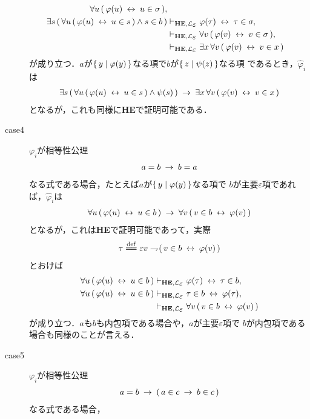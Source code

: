 \begin{metaprf}
\begin{description}
\begin{align}
					\forall u\, (\, \varphi(u) \lrarrow u \in \sigma\, ), \\
					\exists s\, (\, \forall u\, (\, \varphi(u) \lrarrow u \in s\, )
					\wedge s \in b\, )
					&\provable{\mbox{{\bf HE}},\lang{\varepsilon}} \varphi(\tau) \lrarrow \tau \in \sigma, \\
					&\provable{\mbox{{\bf HE}},\lang{\varepsilon}} \forall v\, (\, \varphi(v) \lrarrow v \in \sigma\, ), \\
					&\provable{\mbox{{\bf HE}},\lang{\varepsilon}} \exists x\, \forall v\, (\, \varphi(v) \lrarrow v \in x\, )
				\end{align}
				が成り立つ．$a$が$\{\, y \mid \varphi(y)\, \}$なる項で$b$が$\{\, z \mid \psi(z)\, \}$なる項
				であるとき，$\widehat{\varphi}_{i}$は
				\begin{align}
					\exists s\, (\, \forall u\, (\, \varphi(u) \hspace{0.25em}\leftrightarrow\hspace{0.25em} u \in s\, )
					\wedge \psi(s)\, ) \hspace{0.25em}\rightarrow\hspace{0.25em} \exists x\, \forall v\, (\, \varphi(v) \hspace{0.25em}\leftrightarrow\hspace{0.25em} v \in x\, )
				\end{align}
				となるが，これも同様に{\bf HE}で証明可能である．
				
			\item[case4] $\varphi_{i}$が相等性公理
				\begin{align}
					a = b \hspace{0.25em}\rightarrow\hspace{0.25em} b = a
				\end{align}
				なる式である場合，たとえば$a$が$\{\, y \mid \varphi(y)\, \}$なる項で
				$b$が主要$\varepsilon$項であれば，$\widehat{\varphi}_{i}$は
				\begin{align}
					\forall u\, (\, \varphi(u) \hspace{0.25em}\leftrightarrow\hspace{0.25em} u \in b\, ) 
					\hspace{0.25em}\rightarrow\hspace{0.25em} \forall v\, (\, v \in b \hspace{0.25em}\leftrightarrow\hspace{0.25em} \varphi(v)\, ) 
				\end{align}
				となるが，これは{\bf HE}で証明可能であって，実際
				\begin{align}
					\tau \defeq \varepsilon v \negation (\, v \in b \lrarrow \varphi(v)\, )
				\end{align}
				とおけば
				\begin{align}
					\forall u\, (\, \varphi(u) \lrarrow u \in b\, ) 
					&\provable{\mbox{{\bf HE}},\lang{\varepsilon}} \varphi(\tau) \lrarrow \tau \in b, \\
					\forall u\, (\, \varphi(u) \lrarrow u \in b\, ) 
					&\provable{\mbox{{\bf HE}},\lang{\varepsilon}} \tau \in b \lrarrow \varphi(\tau), \\
					&\provable{\mbox{{\bf HE}},\lang{\varepsilon}} \forall v\, (\, v \in b \lrarrow \varphi(v)\, )
				\end{align}
				が成り立つ．$a$も$b$も内包項である場合や，$a$が主要$\varepsilon$項で
				$b$が内包項である場合も同様のことが言える．
			
			\item[case5] $\varphi_{i}$が相等性公理
				\begin{align}
					a = b \hspace{0.25em}\rightarrow\hspace{0.25em} (\, a \in c \hspace{0.25em}\rightarrow\hspace{0.25em} b \in c\, )
				\end{align}
				なる式である場合，
		\end{description}
	\end{metaprf}